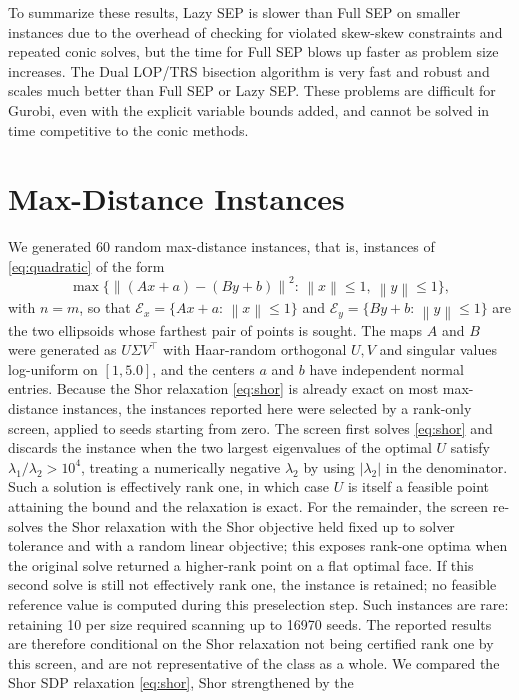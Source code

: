 \documentclass[11pt]{article}
\providecommand{\Ecal}{\mathcal{E}}
\providecommand{\suchthat}{:\,}
\providecommand{\norm}[1]{\left\lVert #1\right\rVert}
\begin{document}
To summarize these results, Lazy SEP is slower than Full SEP on smaller
instances due to the overhead of checking for violated skew-skew constraints
and repeated conic solves, but the time for Full SEP blows up faster as
problem size increases.  The Dual LOP/TRS bisection algorithm is very fast
and robust and scales much better than Full SEP or Lazy SEP.  These problems
are difficult for Gurobi, even with the explicit variable bounds added, and
cannot be solved in time competitive to the conic methods.

\section{Max-Distance Instances}
\noindent We generated 60 random max-distance instances, that is,
instances of \eqref{eq:quadratic} of the form
\[
\max\{\norm{(Ax+a)-(By+b)}^2\suchthat \norm{x}\le 1,\ \norm{y}\le 1\},
\]
with \(n=m\), so that \(\Ecal_x=\{Ax+a\suchthat\norm{x}\le 1\}\) and
\(\Ecal_y=\{By+b\suchthat\norm{y}\le 1\}\) are the two ellipsoids whose
farthest pair of points is sought.  The maps \(A\) and \(B\) were generated as
\(U\Sigma V^\top\) with Haar-random orthogonal \(U,V\) and singular values log-uniform on \([1,5.0]\), and the centers \(a\) and \(b\) have independent normal
entries.  Because the Shor relaxation \eqref{eq:shor} is already exact on most max-distance instances, the instances reported here were selected by a rank-only screen, applied to seeds starting from zero.  The screen first solves \eqref{eq:shor} and discards the instance when the two largest eigenvalues of the optimal \(U\) satisfy \(\lambda_1/\lambda_2>10^4\), treating a numerically negative \(\lambda_2\) by using \(|\lambda_2|\) in the denominator.  Such a solution is effectively rank one, in which case \(U\) is itself a feasible point attaining the bound and the relaxation is exact.  For the remainder, the screen re-solves the Shor relaxation with the Shor objective held fixed up to solver tolerance and with a random linear objective; this exposes rank-one optima when the original solve returned a higher-rank point on a flat optimal face.  If this second solve is still not effectively rank one, the instance is retained; no feasible reference value is computed during this preselection step.  Such instances are rare: retaining 10 per size required scanning up to 16970 seeds.  The reported results are therefore conditional on the Shor relaxation not being certified rank one by this screen, and are not representative of the class as a whole.
We compared the Shor SDP relaxation \eqref{eq:shor}, Shor strengthened by the
\end{document}
